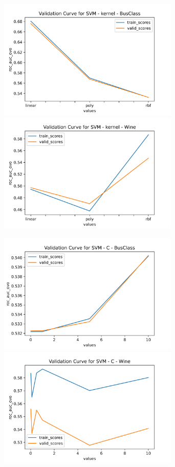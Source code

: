 \documentclass[
	letterpaper, %
]{jdf}
\begin{document}
\includegraphics[width=3.4in]{Figures/BusClass-0920/SVM/val_curve_0.png}
\includegraphics[width=3.4in]{Figures/Wine-0921/SVM/val_curve_0.png}

\includegraphics[width=3.4in]{Figures/BusClass-0920/SVM/val_curve_1.png}
\includegraphics[width=3.4in]{Figures/Wine-0921/SVM/val_curve_1.png}
\end{document}
